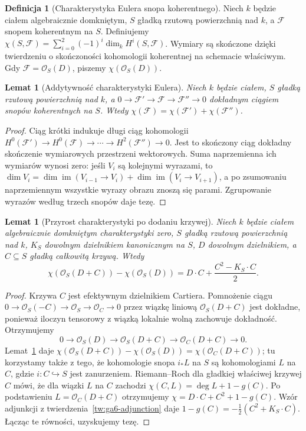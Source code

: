 \documentclass[11pt,a4paper,openany]{report}
\numberwithin{equation}{section}
\theoremstyle{plain}
\newtheorem{lemat}[twierdzenie]{Lemat}
\theoremstyle{definition}
\newtheorem{definicja}[twierdzenie]{Definicja}
\theoremstyle{remark}
\begin{document}
\begin{definicja}[Charakterystyka Eulera snopa koherentnego]
\label{def:ga7-chi}
Niech $k$ będzie ciałem algebraicznie domkniętym,
$S$ gładką rzutową powierzchnią nad $k$, a
$\mathcal F$ snopem koherentnym na $S$. Definiujemy
$\chi(S,\mathcal F)=\sum_{i=0}^{2}(-1)^i
\dim_k H^i(S,\mathcal F)$.
Wymiary są skończone dzięki twierdzeniu o skończoności
kohomologii koherentnej na schemacie właściwym.
Gdy $\mathcal F=\mathcal O_S(D)$, piszemy
$\chi(\mathcal O_S(D))$.
\end{definicja}

\begin{lemat}[Addytywność charakterystyki Eulera]
\label{lem:ga7-chi-exact}
Niech $k$ będzie ciałem, $S$ gładką rzutową powierzchnią
nad $k$, a $0\to\mathcal F'\to\mathcal F\to\mathcal F''\to0$
dokładnym ciągiem snopów koherentnych na $S$. Wtedy
$\chi(\mathcal F)=\chi(\mathcal F')+\chi(\mathcal F'')$.
\end{lemat}
\begin{proof}
Ciąg krótki indukuje długi ciąg kohomologii
$H^0(\mathcal F')\to H^0(\mathcal F)\to\cdots
\to H^2(\mathcal F'')\to0$.
Jest to skończony ciąg dokładny skończenie wymiarowych
przestrzeni wektorowych. Suma naprzemienna ich wymiarów
wynosi zero: jeśli $V_i$ są kolejnymi wyrazami, to
$\dim V_i=\dim\operatorname{im}(V_{i-1}\to V_i)+
\dim\operatorname{im}(V_i\to V_{i+1})$, a po zsumowaniu
naprzemiennym wszystkie wyrazy obrazu znoszą się parami.
Zgrupowanie wyrazów według trzech snopów daje tezę.
\end{proof}

\begin{lemat}[Przyrost charakterystyki po dodaniu krzywej]
\label{lem:ga7-rr-increment}
Niech $k$ będzie ciałem algebraicznie domkniętym charakterystyki
zero, $S$ gładką rzutową powierzchnią nad $k$,
$K_S$ dowolnym dzielnikiem kanonicznym na $S$,
$D$ dowolnym dzielnikiem, a $C\subseteq S$ gładką
całkowitą krzywą. Wtedy
\[
\chi(\mathcal O_S(D+C))-\chi(\mathcal O_S(D))
= D\cdot C+\frac{C^2-K_S\cdot C}{2}.
\]
\end{lemat}
\begin{proof}
Krzywa $C$ jest efektywnym dzielnikiem Cartiera.
Pomnożenie ciągu
$0\to\mathcal O_S(-C)\to\mathcal O_S\to\mathcal O_C\to0$
przez wiązkę liniową $\mathcal O_S(D+C)$ jest dokładne,
ponieważ iloczyn tensorowy z wiązką lokalnie wolną
zachowuje dokładność. Otrzymujemy
\[
0\longrightarrow\mathcal O_S(D)
\longrightarrow\mathcal O_S(D+C)
\longrightarrow\mathcal O_C(D+C)\longrightarrow0.
\]
Lemat~\ref{lem:ga7-chi-exact} daje
$\chi(\mathcal O_S(D+C))-\chi(\mathcal O_S(D))
=\chi(\mathcal O_C(D+C))$; tu korzystamy także z tego,
że kohomologie snopa $i_*L$ na $S$ są kohomologiami
$L$ na $C$, gdzie $i:C\hookrightarrow S$ jest zanurzeniem.
Riemann--Roch dla gładkiej właściwej krzywej
$C$ mówi, że dla wiązki $L$ na $C$ zachodzi
$\chi(C,L)=\deg L+1-g(C)$. Po podstawieniu
$L=\mathcal O_C(D+C)$ otrzymujemy
$\chi= D\cdot C+C^2+1-g(C)$.
Wzór adjunkcji z twierdzenia~\ref{tw:ga6-adjunction}
daje $1-g(C)=-\frac12(C^2+K_S\cdot C)$.
Łącząc te równości, uzyskujemy tezę.
\end{proof}
\end{document}
